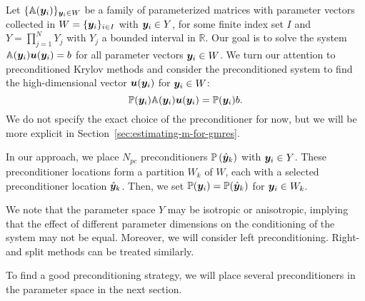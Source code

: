 Let $\{\mathbb{A}({\bm{y}}_i)\}_{{\bm{y}}_i \in W}$ be a family of parameterized matrices with parameter vectors collected in $W=\{{\bm{y}}_i\}_{i\in I}$ with ${\bm{y}}_i\in Y$, for some finite index set $I$ and $Y=\prod_{j=1}^N Y_j$ with $Y_j$ a bounded interval in $\mathbb{R}$.
Our goal is to solve the system $\mathbb{A}({\bm{y}}_i){\bm{u}}({\bm{y}}_i)=b$ for all parameter vectors ${\bm{y}}_i\in W$.
We turn our attention to preconditioned Krylov methods and consider the preconditioned system to find the high-dimensional vector ${\bm{u}}({\bm{y}_i})$ for ${\bm{y}_i}\in W$:
\begin{equation}
    \mathbb{P}({\bm{y}_i})\mathbb{A}({\bm{y}_i}){\bm{u}}({\bm{y}_i})=\mathbb{P}({\bm{y}_i})b.\label{eq:preconditionedsystem}
\end{equation}
We do not specify the exact choice of the preconditioner for now, but we will be more explicit in Section~\ref{sec:estimating-m-for-gmres}.

In our approach, we place $N_{pc}$ preconditioners $\mathbb{P}\left(\hat{{\bm{y}}}_k\right)$ with ${\bm{y}_i} \in Y$.
These preconditioner locations form a partition $W_k$ of $W$, each with a selected preconditioner location $\hat{\bm{y}}_k$.
Then, we set $\mathbb{P}({\bm{y}_i}) = \mathbb{P}(\hat{\bm{y}}_k)$ for ${\bm{y}_i}\in W_k$.

We note that the parameter space $Y$ may be isotropic or anisotropic, implying that the effect of different parameter dimensions on the conditioning of the system may not be equal.
Moreover, we will consider left preconditioning.
Right- and split methods can be treated similarly.

To find a good preconditioning strategy, we will place several preconditioners in the parameter space in the next section.